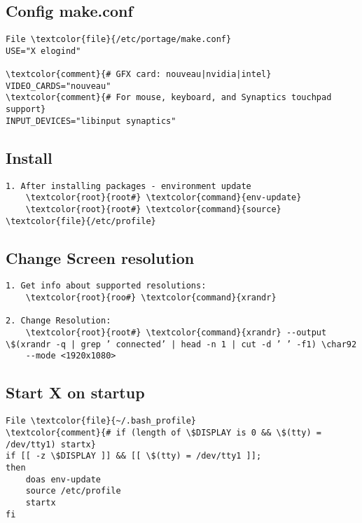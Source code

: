 \documentclass[10pt, a4paper, onecolumn, openany]{book}         %
\begin{document}
\subsection{Config make.conf}
\begin{Verbatim}[commandchars=\\\{\}]
File \textcolor{file}{/etc/portage/make.conf}
USE="X elogind"

\textcolor{comment}{# GFX card: nouveau|nvidia|intel}
VIDEO_CARDS="nouveau"
\textcolor{comment}{# For mouse, keyboard, and Synaptics touchpad support}
INPUT_DEVICES="libinput synaptics"
\end{Verbatim}

\subsection{Install}
\begin{Verbatim}[commandchars=\\\{\}]
1. After installing packages - environment update
    \textcolor{root}{root#} \textcolor{command}{env-update}
    \textcolor{root}{root#} \textcolor{command}{source} \textcolor{file}{/etc/profile}
\end{Verbatim}

\subsection{Change Screen resolution}
\begin{Verbatim}[commandchars=\\\{\}]
1. Get info about supported resolutions:
    \textcolor{root}{roo#} \textcolor{command}{xrandr}
    
2. Change Resolution:
    \textcolor{root}{root#} \textcolor{command}{xrandr} --output \$(xrandr -q | grep ’ connected’ | head -n 1 | cut -d ’ ’ -f1) \char92
    --mode <1920x1080>
\end{Verbatim}

\subsection{Start X on startup}
\begin{Verbatim}[commandchars=\\\{\}]
File \textcolor{file}{~/.bash_profile}
\textcolor{comment}{# if (length of \$DISPLAY is 0 && \$(tty) = /dev/tty1) startx}
if [[ -z \$DISPLAY ]] && [[ \$(tty) = /dev/tty1 ]]; 
then
    doas env-update
    source /etc/profile
    startx
fi
\end{Verbatim}
\end{document}
